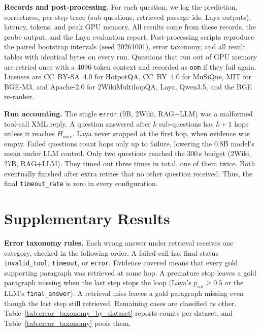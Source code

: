 \textbf{Records and post-processing.} For each question, we log the prediction,
correctness, per-step trace (sub-questions, retrieved passage ids, Laya outputs), latency,
tokens, and peak GPU memory. All results come from these records, the probe output, and
the Laya evaluation report. Post-processing scripts reproduce the paired bootstrap
intervals (seed 20261001), error taxonomy, and all result tables with identical bytes
on every run. Questions that run out of GPU memory are retried once with a 4096-token
context and recorded as \texttt{oom} if they fail again. Licenses are CC~BY-SA~4.0 for
HotpotQA, CC~BY~4.0 for MuSiQue, MIT for BGE-M3, and Apache-2.0 for 2WikiMultihopQA,
Laya, Qwen3.5, and the BGE re-ranker.

\textbf{Run accounting.} The single \texttt{error} (9B, 2Wiki, RAG+LLM) was a malformed
tool-call XML reply. A question answered after $k$ sub-questions has $k+1$ hops unless
it reaches $H_{\max}$. Laya never stopped at the first hop, when evidence was empty.
Failed questions count hops only up to failure, lowering the 0.8B model's mean under
LLM control. Only two questions reached the 300\,s budget (2Wiki, 27B, RAG+LLM).
They timed out three times in total, one of them twice. Both eventually finished after
extra retries that no other question received. Thus, the final \texttt{timeout\_rate}
is zero in every configuration.


\section{Supplementary Results}
\label{sec:appendix:results}

\textbf{Error taxonomy rules.} Each wrong answer under retrieval receives one category,
checked in the following order. A failed call has final status \texttt{invalid\_tool},
\texttt{timeout}, or \texttt{error}. Evidence covered means that every gold supporting
paragraph was retrieved at some hop. A premature stop leaves a gold paragraph missing
when the last step stops the loop (Laya's $p_{\mathrm{suf}}\ge0.5$ or the LLM's
\texttt{final\_answer}). A retrieval miss leaves a gold paragraph missing even though
the last step still retrieved. Remaining cases are classified as other.
Table~\ref{tab:error_taxonomy_by_dataset} reports counts per dataset, and
Table~\ref{tab:error_taxonomy} pools them.



